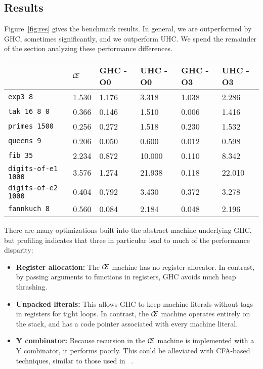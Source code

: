 \subsection{Results} \label{sec:res}

Figure~\ref{fig:res} gives the benchmark results.  In general, we are
outperformed by GHC, sometimes significantly, and we outperform UHC. We
spend the remainder of the section analyzing these performance differences.

\begin{figure*}
\centering
\begin{tabularx}{\textwidth}{l | X | X | X | X | X}
& $\mathcal{\mathcal{C} \mskip -4mu \mathcal{E}}$ & GHC -O0 & UHC -O0 & GHC -O3 & UHC -O3 \\
\hline
\texttt{exp3 8} & 1.530 & 1.176 & 3.318 & 1.038 & 2.286 \\
\texttt{tak 16 8 0} & 0.366 & 0.146 & 1.510 & 0.006 & 1.416 \\
\texttt{primes 1500} & 0.256 & 0.272 & 1.518 & 0.230 & 1.532 \\
\texttt{queens 9} & 0.206 & 0.050 & 0.600 & 0.012 & 0.598 \\
\texttt{fib 35} & 2.234 & 0.872 & 10.000 & 0.110 & 8.342 \\
\texttt{digits-of-e1 1000} & 3.576 & 1.274 & 21.938 & 0.118 & 22.010 \\
\texttt{digits-of-e2 1000} & 0.404 & 0.792 & 3.430 & 0.372 & 3.278 \\
\texttt{fannkuch 8} & 0.560 & 0.084 & 2.184 & 0.048 & 2.196 \\
\end{tabularx}
\caption{Machine Literals Benchmark Results. Measurement is wall clock time,
units are seconds. Times averaged over 5 runs.}
\label{fig:res}
\end{figure*}

There are many optimizations built into the abstract machine underlying GHC,
but profiling indicates that three in particular lead to much of the performance
disparity: 

\begin{itemize}
\item \textbf{Register allocation:} The $\mathcal{\mathcal{C} \mskip -4mu \mathcal{E}}$ machine has no register
allocator. In contrast, by passing arguments to functions in registers, GHC
avoids much heap thrashing.
\item \textbf{Unpacked literals:} This allows GHC to keep machine literals
without tags in registers for tight loops. In contrast, the $\mathcal{\mathcal{C} \mskip -4mu \mathcal{E}}$
machine operates entirely on the stack, and has a code pointer associated with
every machine literal. 
\item \textbf{Y combinator:} Because recursion in the $\mathcal{\mathcal{C} \mskip -4mu \mathcal{E}}$ machine is
implemented with a Y combinator, it performs poorly. This could be alleviated
with CFA-based techniques, similar to those used in ~\cite{rozas1992taming}. 
\end{itemize}

